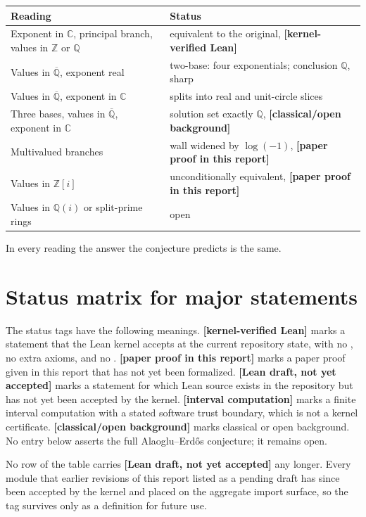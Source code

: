 \documentclass[11pt,oneside]{article}
\theoremstyle{definition}
\theoremstyle{remark}
\newcommand{\Z}{\mathbb Z}
\newcommand{\Q}{\mathbb Q}
\newcommand{\C}{\mathbb C}
\newcommand{\Abar}{\overline{\mathbb Q}}
\newcommand{\Qbar}{\Abar}
\newcommand{\lean}[1]{\texttt{\detokenize{#1}}}
\newcommand{\statuslean}{\textcolor{leanblue}{\textbf{[kernel-verified Lean]}}}
\newcommand{\statusnew}{\textcolor{newgreen}{\textbf{[paper proof in this report]}}}
\newcommand{\statuscomp}{\textcolor{computeviolet}{\textbf{[interval computation]}}}
\newcommand{\statusknown}{\textcolor{classicalgray}{\textbf{[classical/open background]}}}
\newcommand{\statusdraft}{\textcolor{computeviolet}{\textbf{[Lean draft, not yet accepted]}}}
\begin{document}
\begin{center}
\begin{tabular}{ll}
\toprule
Reading & Status \\
\midrule
Exponent in $\C$, principal branch, values in $\Z$ or $\Q$ &
equivalent to the original, \statuslean \\
Values in $\Qbar$, exponent real & two-base: four exponentials; conclusion $\Q$, sharp \\
Values in $\Qbar$, exponent in $\C$ & splits into real and unit-circle slices \\
Three bases, values in $\Qbar$, exponent in $\C$ & solution set exactly $\Q$, \statusknown \\
Multivalued branches & wall widened by $\log(-1)$, \statusnew \\
Values in $\Z[i]$ & unconditionally equivalent, \statusnew \\
Values in $\Q(i)$ or split-prime rings & open \\
\bottomrule
\end{tabular}
\end{center}

In every reading the answer the conjecture predicts is the same.

\appendix

\section{Status matrix for major statements}
\label{app:status}

The status tags have the following meanings.  \statuslean{} marks a statement that the Lean
kernel accepts at the current repository state, with no \lean{sorry}, no extra axioms, and no
\lean{native_decide}.  \statusnew{} marks a paper proof given in this report that has not yet
been formalized.  \statusdraft{} marks a statement for which Lean source exists in the
repository but has not yet been accepted by the kernel.  \statuscomp{} marks a finite
interval computation with a stated software trust boundary, which is not a kernel
certificate.  \statusknown{} marks classical or open background.  No entry below asserts the
full Alaoglu--Erd\H{o}s conjecture; it remains open.

No row of the table carries \statusdraft{} any longer.  Every module that earlier revisions
of this report listed as a pending draft has since been accepted by the kernel and placed on
the aggregate import surface, so the tag survives only as a definition for future use.
\end{document}
